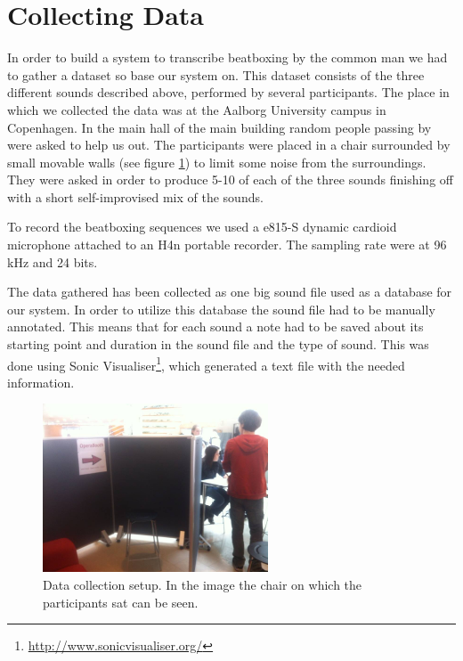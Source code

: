 \section{Collecting Data}
\label{sec:collecting-data}
In order to build a system to transcribe beatboxing by the common man we had to gather a dataset so base our system on. This dataset consists of the three different sounds described above, performed by several participants. The place in which we collected the data was at the Aalborg University campus in Copenhagen. In the main hall of the main building random people passing by were asked to help us out. The participants were placed in a chair surrounded by small movable walls (see figure \ref{data-collection-pic}) to limit some noise from the surroundings. They were asked in order to produce 5-10 of each of the three sounds finishing off with a short self-improvised mix of the sounds.

To record the beatboxing sequences we used a e815-S dynamic cardioid microphone attached to an H4n portable recorder. The sampling rate were at 96 kHz and 24 bits.

The data gathered has been collected as one big sound file used as a database for our system. In order to utilize this database the sound file had to be manually annotated. This means that for each sound a note had to be saved about its starting point and duration in the sound file and the type of sound. This was done using Sonic Visualiser\footnote{\url{http://www.sonicvisualiser.org/}}, which generated a text file with the needed information.

\begin{figure}[h]
	\begin{center}
		\includegraphics[height=5cm]{fig/dataset_collection.JPG}
		\caption{Data collection setup. In the image the chair on which the participants sat can be seen.}
		\label{data-collection-pic}
	\end{center}
\end{figure}
